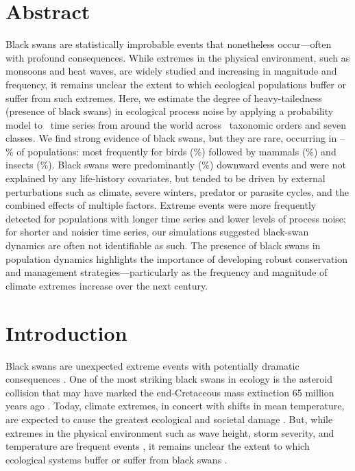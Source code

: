 
\section{Abstract}

Black swans are statistically improbable events that nonetheless occur---often
with profound consequences. While extremes in the physical environment, such
as monsoons and heat waves, are widely studied and increasing in magnitude and
frequency, it remains unclear the extent to which ecological populations
buffer or suffer from such extremes. Here, we estimate the degree of
heavy-tailedness (presence of black swans) in ecological process noise by
applying a probability model to \NPops~time series from around the world
across \NOrders~taxonomic orders and seven classes. We find strong evidence of
black swans, but they are rare, occurring in
\overallMinPerc--\overallMaxPerc\% of populations: most frequently for birds
(\AvesRangePerc\%) followed by mammals (\MammaliaRangePerc\%) and insects
(\InsectaRangePerc\%). Black swans were predominantly (\percBSDown \%)
downward events and were not explained by any life-history covariates, but
tended to be driven by external perturbations such as climate, severe winters,
predator or parasite cycles, and the combined effects of multiple factors.
Extreme events were more frequently detected for populations with longer time
series and lower levels of process noise; for shorter and noisier time series,
our simulations suggested black-swan dynamics are often not identifiable as
such. The presence of black swans in population dynamics highlights the
importance of developing robust conservation and management
strategies---particularly as the frequency and magnitude of climate extremes
increase over the next century.

\section{Introduction}

Black swans are unexpected extreme events with potentially dramatic
consequences \citep{taleb2007,sornette2009}. One of the most striking black
swans in ecology is the asteroid collision that may have marked the
end-Cretaceous mass extinction 65 million years ago
\citep{alvarez1980,harnik2012}. Today, climate extremes, in concert with
shifts in mean temperature, are expected to cause the greatest ecological and
societal damage \citep{ipcc2012}. But, while extremes in the physical
environment such as wave height, storm severity, and temperature are frequent
events \citep{gaines1993,katz2005}, it remains unclear the extent to which
ecological systems buffer or suffer from black swans \citep{nunez2012}.

